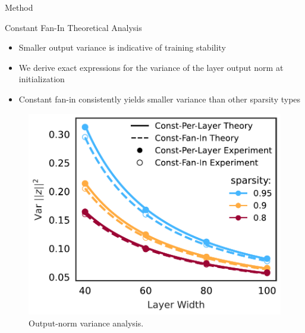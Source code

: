 \documentclass[final]{beamer}
\newlength{\colwidth}
\begin{document}
\begin{frame}[t]
\begin{columns}[t]
\begin{column}{\colwidth}
\begin{block}{Method}
    \end{block}

  \begin{block}{Constant Fan-In Theoretical Analysis}
  \begin{itemize}
      \item Smaller output variance is indicative of training stability
      \item We derive exact expressions for the variance of the layer output norm at initialization
      \item Constant fan-in consistently yields smaller variance than other sparsity types
  \end{itemize}

\begin{figure}
    \includegraphics[width=.5\colwidth]{srigl_example_figs/Theory_1.pdf}
    \caption{Output-norm variance analysis.}\label{fig:theory}
\end{figure}
\end{block}


\end{column}
\end{columns}
\end{frame}
\end{document}
